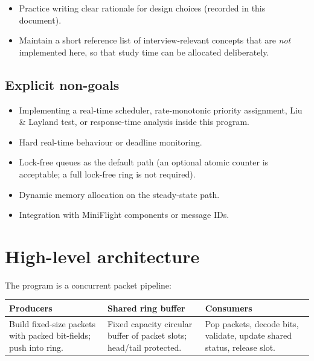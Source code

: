 \documentclass[11pt,a4paper]{article}
\begin{document}
\begin{itemize}[leftmargin=*]
    \item Practice writing clear rationale for design choices (recorded in this document).
    \item Maintain a short reference list of interview-relevant concepts that are \emph{not} implemented here, so that study time can be allocated deliberately.
\end{itemize}

\subsection{Explicit non-goals}

\begin{itemize}[leftmargin=*]
    \item Implementing a real-time scheduler, rate-monotonic priority assignment, Liu \& Layland test, or response-time analysis inside this program.
    \item Hard real-time behaviour or deadline monitoring.
    \item Lock-free queues as the default path (an optional atomic counter is acceptable; a full lock-free ring is not required).
    \item Dynamic memory allocation on the steady-state path.
    \item Integration with MiniFlight components or message IDs.
\end{itemize}

\section{High-level architecture}
\label{sec:architecture}

The program is a concurrent packet pipeline:

\begin{center}
\begin{tabular}{@{}p{}p{}p{}@{}}
\toprule
\textbf{Producers} & \textbf{Shared ring buffer} & \textbf{Consumers} \\
\midrule
Build fixed-size packets with packed bit-fields; push into ring. &
Fixed capacity circular buffer of packet slots; head/tail protected. &
Pop packets, decode bits, validate, update shared status, release slot. \\
\bottomrule
\end{tabular}
\end{center}
\end{document}
